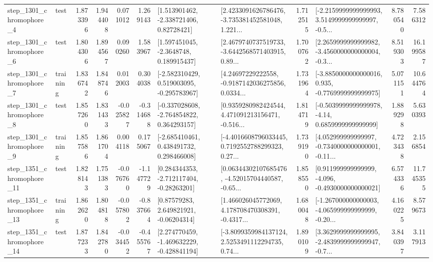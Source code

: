 \begin{tabular}{llrrrrllrlrr}
  step\_1301\_chromophore\_4 &      test &      1.873396 &    1.944408 &      0.071012 &  1.269143 &     [1.513901462, -2.338721406, 0.82728421] &  [2.4233091626786476, -3.735381452581048, 1.221... &       1.712515 &  [-2.2159999999999993, 3.5149999999999997, -0.5... &            8.780540 &          7.586312 \\
  step\_1301\_chromophore\_6 &      test &      1.804306 &    1.894567 &      0.090260 &  1.583967 &      [1.597451045, -2.3648748, 0.189915437] &  [2.4679740737519733, -3.6442568571403915, 0.89... &       1.700762 &  [2.2659999999999982, -3.4560000000000004, -0.3... &            8.519303 &         16.199587 \\
  step\_1301\_chromophore\_7 &  training &      1.836742 &    1.848746 &      0.012003 &  0.304038 &   [-2.582310429, 0.519003095, -0.295783967] &  [4.24697229222558, -0.9187142036275856, 0.0334... &       1.731964 &  [-3.8850000000000016, 0.935, -0.7769999999999975] &            5.071151 &         10.644764 \\
  step\_1301\_chromophore\_8 &      test &      1.857260 &    1.831433 &     -0.025827 & -0.314688 &   [-0.337028608, -2.764854822, 0.364293157] &  [0.9359280982424544, 4.471091213156471, -0.516... &       1.814719 &   [-0.5039999999999978, -4.14, 0.6859999999999999] &            1.889298 &          5.630393 \\
  step\_1301\_chromophore\_9 &  training &      1.857586 &    1.861704 &      0.004118 &  0.175067 &    [-2.685410461, 0.438491732, 0.298466008] &  [-4.4016608796033445, 0.7192552788299323, 0.27... &       1.739190 &  [4.052999999999997, -0.7340000000000001, -0.11... &            4.723438 &          2.156854 \\
 step\_1351\_chromophore\_11 &      test &      1.828143 &    1.751383 &     -0.076760 & -1.147729 &    [0.284344353, -2.712117404, -0.28263201] &  [0.06344302107685476, -4.52015704440587, -0.65... &       1.858550 &   [0.911999999999999, -4.096, -0.4930000000000021] &            6.574336 &         11.745355 \\
 step\_1351\_chromophore\_13 &  training &      1.862620 &    1.804818 &     -0.057802 & -0.837664 &      [0.87579283, 2.649821921, -0.06204314] &  [1.466026045772069, 4.178708470308391, -0.4317... &       1.680048 &  [-1.267000000000003, -4.065999999999999, -0.20... &            4.160225 &          8.579673 \\
 step\_1351\_chromophore\_14 &      test &      1.877233 &    1.842780 &     -0.034452 & -0.455767 &   [2.274770459, -1.469632229, -0.428841194] &  [-3.8099359984137124, 2.5253491112294735, 0.74... &       1.890109 &  [3.3629999999999995, -2.4839999999999947, -0.7... &            3.840397 &          3.117913 \\

\end{tabular}
